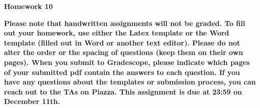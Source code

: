 \documentclass[12pt]{article}
\date{}
\begin{document}
	\begin{flushleft}
		\large \bf
		Homework 10 \\
	\end{flushleft}
{\bf
Please note that handwritten assignments will not be graded. To fill out your homework, use either the Latex template or the Word template (filled out in Word or another text editor). Please do not alter the order or the spacing of questions (keep them on their own pages). When you submit to Gradescope, please indicate which pages of your submitted pdf contain the answers to each question. If you have any questions about the templates or submission process, you can reach out to the TAs on Piazza. This assignment is due at 23:59 on December 11th.
}	
	
\end{document}
